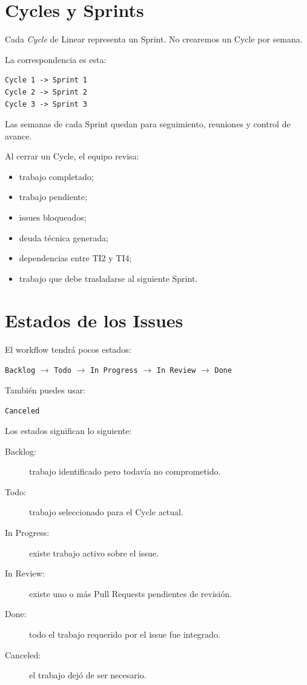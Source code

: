\documentclass[11pt,a4paper]{article}
\begin{document}

\section{Cycles y Sprints}

Cada \textit{Cycle} de Linear representa un Sprint. No crearemos un Cycle por
semana.

La correspondencia es esta:

\begin{lstlisting}
Cycle 1 -> Sprint 1
Cycle 2 -> Sprint 2
Cycle 3 -> Sprint 3
\end{lstlisting}

Las semanas de cada Sprint quedan para seguimiento, reuniones y control de
avance.

Al cerrar un Cycle, el equipo revisa:

\begin{itemize}
  \item trabajo completado;
  \item trabajo pendiente;
  \item issues bloqueados;
  \item deuda técnica generada;
  \item dependencias entre TI2 y TI4;
  \item trabajo que debe trasladarse al siguiente Sprint.
\end{itemize}


\section{Estados de los Issues}

El workflow tendrá pocos estados:

\begin{center}
  \texttt{Backlog}
  $\rightarrow$
  \texttt{Todo}
  $\rightarrow$
  \texttt{In Progress}
  $\rightarrow$
  \texttt{In Review}
  $\rightarrow$
  \texttt{Done}
\end{center}

También puedes usar:

\begin{center}
  \texttt{Canceled}
\end{center}

Los estados significan lo siguiente:

\begin{description}
  \item[Backlog:] trabajo identificado pero todavía no comprometido.
  \item[Todo:] trabajo seleccionado para el Cycle actual.
  \item[In Progress:] existe trabajo activo sobre el issue.
  \item[In Review:] existe uno o más Pull Requests pendientes de revisión.
  \item[Done:] todo el trabajo requerido por el issue fue integrado.
  \item[Canceled:] el trabajo dejó de ser necesario.
\end{description}
\end{document}
